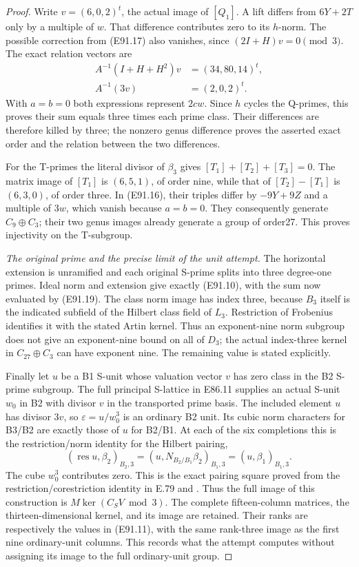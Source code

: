 \begin{proof}
Write $v=(6,0,2)^t$, the actual image of $[Q_1]$. A lift
differs from $6Y+2T$ only by a multiple of $w$. That difference
contributes zero to its $h$-norm. The possible correction from
(E91.17) also vanishes, since $(2I+H)v=0\pmod3$. The exact
relation vectors are
\[
 \begin{aligned}
 A^{-1}(I+H+H^2)v&=(34,80,14)^t,\\
 A^{-1}(3v)&=(2,0,2)^t.
 \end{aligned}
 \tag{E91.19}
\]
With $a=b=0$ both expressions represent $2c w$. Since $h$
cycles the Q-primes, this proves their sum equals three times
each prime class. Their differences are therefore killed by
three; the nonzero genus difference proves the asserted exact
order and the relation between the two differences.

For the T-primes the literal divisor of $\beta_3$ gives
$[T_1]+[T_2]+[T_3]=0$. The matrix image of $[T_1]$ is
$(6,5,1)$, of order nine, while that of $[T_2]-[T_1]$ is
$(6,3,0)$, of order three. In (E91.16), their triples differ
by $-9Y+9Z$ and a multiple of $3w$, which vanish because
$a=b=0$. They consequently generate $C_9\oplus C_3$;
their two genus images already generate a group of order27.
This proves injectivity on the T-subgroup.

\emph{The original prime and the precise limit of the unit attempt.}
The horizontal extension is unramified and each original
S-prime splits into three degree-one primes. Ideal norm and
extension give exactly (E91.10), with the sum now evaluated
by (E91.19). The class norm image has index three, because
$B_3$ itself is the indicated subfield of the Hilbert class
field of $L_3$. Restriction of Frobenius identifies it with
the stated Artin kernel. Thus an exponent-nine norm subgroup
does not give an exponent-nine bound on all of $D_3$; the
actual index-three kernel in $C_{27}\oplus C_3$ can have
exponent nine. The remaining value is stated explicitly.

Finally let $u$ be a B1 S-unit whose valuation vector $v$
has zero class in the B2 S-prime subgroup. The full principal
S-lattice in E86.11 supplies an actual S-unit $w_0$ in B2
with divisor $v$ in the transported prime basis. The included
element $u$ has divisor $3v$, so
$\varepsilon=u/w_0^3$ is an ordinary B2 unit. Its cubic norm
characters for B3/B2 are exactly those of $u$ for B2/B1.
At each of the six completions this is the restriction/norm
identity for the Hilbert pairing,
\[
 (\operatorname{res}u,\beta_2)_{B_2,3}
       =(u,N_{B_2/B_1}\beta_2)_{B_1,3}
       =(u,\beta_1)_{B_1,3}.
 \tag{E91.20}
\]
The cube $w_0^3$ contributes zero. This is the exact pairing
square proved from the restriction/corestriction identity in
E.79 and \cite[III,Theorem3.1]{E_MilneCFT}.
Thus the full image of this construction is
$M\ker(C_SV\bmod3)$. The complete fifteen-column matrices,
the thirteen-dimensional kernel, and its image are retained.
Their ranks are respectively the values in (E91.11), with
the same rank-three image as the first nine ordinary-unit
columns. This records what the attempt computes without
assigning its image to the full ordinary-unit group.


\end{proof}
